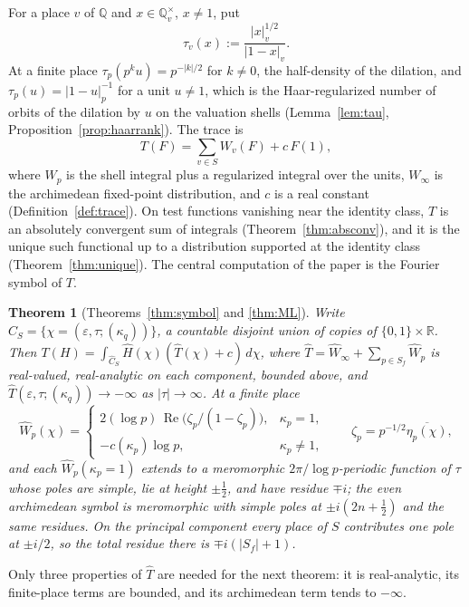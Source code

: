 \documentclass[11pt]{amsart}
\newtheorem{theorem}{Theorem}[section]
\theoremstyle{definition}
\theoremstyle{remark}
\newcommand{\R}{\mathbb R}
\newcommand{\Q}{\mathbb Q}
\newcommand{\Rel}{\operatorname{Re}}
\begin{document}
For a place $v$ of $\Q$ and $x\in\Q_v^{\times}$, $x\ne1$, put
\[
\tau_v(x):=\frac{|x|_v^{1/2}}{|1-x|_v}.
\]
At a finite place $\tau_p(p^ku)=p^{-|k|/2}$ for $k\ne0$, the half-density of
the dilation, and $\tau_p(u)=|1-u|_p^{-1}$ for a unit $u\ne1$, which is the
Haar-regularized number of orbits of the dilation by $u$ on the valuation
shells (Lemma~\ref{lem:tau}, Proposition~\ref{prop:haarrank}).  The trace is
\[
T(F)=\sum_{v\in S}W_v(F)+c\,F(1),
\]
where $W_p$ is the shell integral plus a regularized integral over the units,
$W_{\infty}$ is the archimedean fixed-point distribution, and $c$ is a real
constant (Definition~\ref{def:trace}).  On test functions vanishing near the
identity class, $T$ is an absolutely convergent sum of integrals
(Theorem~\ref{thm:absconv}), and it is the unique such functional up to a
distribution supported at the identity class (Theorem~\ref{thm:unique}).
The central computation of the paper is the Fourier symbol of $T$.

\begin{theorem}[Theorems~\ref{thm:symbol} and \ref{thm:ML}]\label{thm:introB}
Write $\widehat C_S=\{\chi=(\varepsilon,\tau;(\kappa_q))\}$, a countable
disjoint union of copies of $\{0,1\}\times\R$.  Then
$T(H)=\int_{\widehat C_S}\widehat H(\chi)(\widehat T(\chi)+c)\,d\chi$, where
$\widehat T=\widehat W_{\infty}+\sum_{p\in S_f}\widehat W_p$ is
real-valued, real-analytic on each component, bounded above, and
$\widehat T(\varepsilon,\tau;(\kappa_q))\to-\infty$ as $|\tau|\to\infty$.  At
a finite place
\[
\widehat W_p(\chi)=
\begin{cases}
2(\log p)\,\Rel\bigl(\zeta_p/(1-\zeta_p)\bigr), & \kappa_p=1,\\[2pt]
-c(\kappa_p)\log p, & \kappa_p\neq1,
\end{cases}
\qquad \zeta_p=p^{-1/2}\overline{\eta_p(\chi)},
\]
and each $\widehat W_p(\kappa_p=1)$ extends to a meromorphic
$2\pi/\log p$-periodic function of $\tau$ whose poles are simple, lie at
height $\pm\tfrac12$, and have residue $\mp i$; the even archimedean symbol is
meromorphic with simple poles at $\pm i(2n+\tfrac12)$ and the same residues.
On the principal component every place of $S$ contributes one pole at $\pm
i/2$, so the total residue there is $\mp i(|S_f|+1)$.
\end{theorem}

Only three properties of $\widehat T$ are needed for the next theorem: it is
real-analytic, its finite-place terms are bounded, and its archimedean term
tends to $-\infty$.
\end{document}
